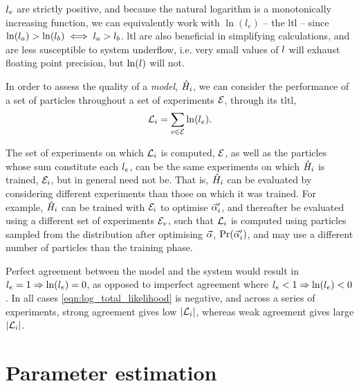 $l_{e}$ are strictly positive, and because the natural logarithm is a monotonically increasing function, 
we can equivalently work with $\ln{(l_e)}$ --  the \gls{ltl} -- 
since $\ln(l_a) > \ln(l_b) \iff l_a > l_b$. 
\gls{ltl} are also beneficial in simplifying calculations, 
and are less susceptible to system underflow, 
i.e. very small values of $l$ will exhaust floating point precision, 
but $\ln(l)$ will not. 
\par 

In order to assess the quality of a \emph{model}, $\hat{H}_i$, 
we can consider the performance of a set of \glspl{particle} throughout a set of \glspl{experiment} ${ \mathcal{E} }$, 
through its \gls{tltl}, 
\begin{equation}
\label{eqn:log_total_likelihood}
{\mathcal{L}}_{i} = \sum\limits_{e \in { \mathcal{E} }} \ln(l_{e}).    
\end{equation}

The set of \glspl{experiment} on which ${\mathcal{L}}_{i}$ is computed, ${ \mathcal{E} }$, 
as well as the \glspl{particle} whose sum constitute each $l_{e}$,
can be the same \glspl{experiment} on which $\hat{H}_i$ is trained, ${ \mathcal{E} }_i$, but in general need not be.
That is, $\hat{H}_i$ can be evaluated by considering different \glspl{experiment} than those on which it was trained.
For example, $\hat{H}_i$ can be trained with ${ \mathcal{E} }_i$ to optimise $\vec{\alpha}_i^{\prime}$, 
and thereafter be evaluated using a different set of \glspl{experiment} ${ \mathcal{E} }_v$, 
such that ${\mathcal{L}}_{i}$ is computed using \glspl{particle} sampled from the distribution after optimising $\vec{\alpha}$, 
$\Pr(\vec{\alpha}_i^{\prime})$, and may use a different number of \glspl{particle} than the training phase. 
\par 

Perfect agreement between the model and the system would result in $l_{e}=1 \Rightarrow \ln(l_{e})=0$, 
as opposed to imperfect agreement where $l_{e} < 1 \Rightarrow \ln(l_{e}) < 0$.
In all cases \cref{eqn:log_total_likelihood} is negative, 
and across a series of \glspl{experiment},
strong agreement gives low $\lvert {\mathcal{L}}_{i} \rvert $, 
whereas weak agreement gives large $\lvert {\mathcal{L}}_{i} \rvert $. 


\section{Parameter estimation}

